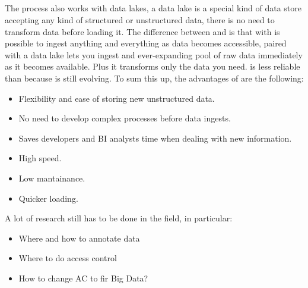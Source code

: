 \subsection{\elt}
The \elt process also works with data lakes, a data lake is a special kind of data store accepting any kind of structured or unstructured data, there is no need to transform data before loading it. \n
The difference between \etl and \elt is that with \elt is possible to ingest anything and everything as data becomes accessible, \elt paired with a data lake lets you ingest and ever-expanding pool of raw data immediately as it becomes available. Plus it transforms only the data you need. \n
\elt is less reliable than \etl because \elt is still evolving. \n
To sum this up, the advantages of \elt are the following:
\begin{itemize}
    \item Flexibility and ease of storing new unstructured data.
    \item No need to develop complex \etl processes before data ingests.
    \item Saves developers and BI analysts time when dealing with new information.
    \item High speed.
    \item Low mantainance.
    \item Quicker loading.
\end{itemize}
\smallSpace
A lot of research still has to be done in the field, in particular:
\begin{itemize}
    \item Where and how to annotate data
    \item Where to do access control
    \item How to change AC to fir Big Data?
\end{itemize}